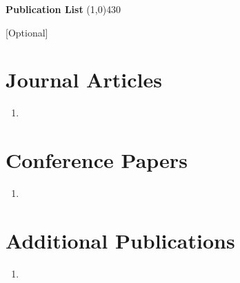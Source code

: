 \clearpage
\setlength{\headheight}{14pt}
\begin{center}
{\huge \bf Publication List}
\line(1,0){430}
\end{center}

[Optional]


\section*{Journal Articles}
\begin{enumerate}
\item 
\end{enumerate}

\section*{Conference Papers}
\begin{enumerate}
\item 
\end{enumerate}


\section*{Additional Publications}

\begin{enumerate}
\item 
\end{enumerate}


  
\clearpage
\setlength{\headheight}{12pt}